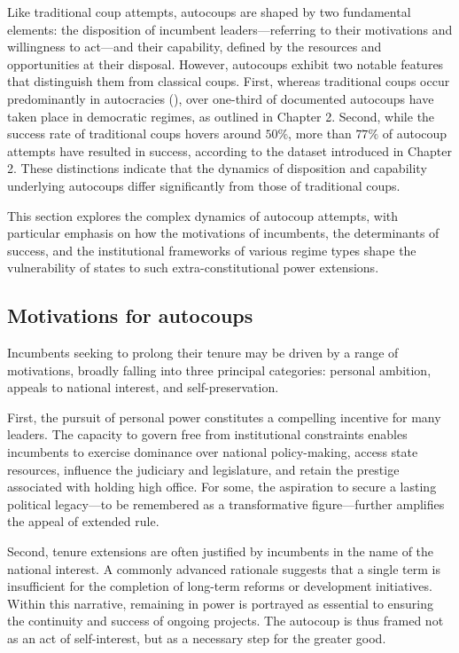 \documentclass[
  12pt,
]{report}
\begin{document}
Like traditional coup attempts, autocoups are shaped by two fundamental
elements: the disposition of incumbent leaders---referring to their
motivations and willingness to act---and their capability, defined by
the resources and opportunities at their disposal. However, autocoups
exhibit two notable features that distinguish them from classical coups.
First, whereas traditional coups occur predominantly in autocracies
(), over one-third
of documented autocoups have taken place in democratic regimes, as
outlined in Chapter 2. Second, while the success rate of traditional
coups hovers around \(50\%\), more than \(77\%\) of autocoup attempts
have resulted in success, according to the dataset introduced in Chapter
2. These distinctions indicate that the dynamics of disposition and
capability underlying autocoups differ significantly from those of
traditional coups.

This section explores the complex dynamics of autocoup attempts, with
particular emphasis on how the motivations of incumbents, the
determinants of success, and the institutional frameworks of various
regime types shape the vulnerability of states to such
extra-constitutional power extensions.

\subsection*{Motivations for autocoups}\label{motivations-for-autocoups}

Incumbents seeking to prolong their tenure may be driven by a range of
motivations, broadly falling into three principal categories: personal
ambition, appeals to national interest, and self-preservation.

First, the pursuit of personal power constitutes a compelling incentive
for many leaders. The capacity to govern free from institutional
constraints enables incumbents to exercise dominance over national
policy-making, access state resources, influence the judiciary and
legislature, and retain the prestige associated with holding high
office. For some, the aspiration to secure a lasting political
legacy---to be remembered as a transformative figure---further amplifies
the appeal of extended rule.

Second, tenure extensions are often justified by incumbents in the name
of the national interest. A commonly advanced rationale suggests that a
single term is insufficient for the completion of long-term reforms or
development initiatives. Within this narrative, remaining in power is
portrayed as essential to ensuring the continuity and success of ongoing
projects. The autocoup is thus framed not as an act of self-interest,
but as a necessary step for the greater good.
\end{document}
